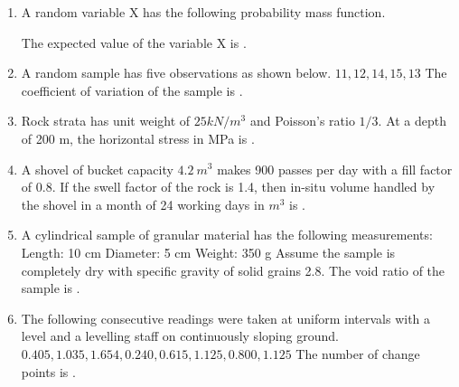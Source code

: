 \documentclass[journal,12pt,onecolumn]{IEEEtran}
\theoremstyle{remark}
\begin{document}
\begin{enumerate}
\hfill{}

\item A random variable X has the following probability mass function.

The expected value of the variable X is \underline{\hspace{2cm}} .

\hfill{}

\item A random sample has five observations as shown below.
$11, 12, 14, 15, 13$
The coefficient of variation of the sample is \underline{\hspace{2cm}} .

\hfill{}

\item Rock strata has unit weight of $25 kN/m^{3}$ and Poisson's ratio $1/3$. At a depth of 200 m, the horizontal stress in MPa is \underline{\hspace{2cm}} .

\hfill{}

\item A shovel of bucket capacity $4.2~m^{3}$ makes 900 passes per day with a fill factor of 0.8. If the swell factor of the rock is 1.4, then in-situ volume handled by the shovel in a month of 24 working days in $m^{3}$ is \underline{\hspace{2cm}} .

\hfill{}

\item A cylindrical sample of granular material has the following measurements:
Length: 10 cm
Diameter: 5 cm
Weight: 350 g
Assume the sample is completely dry with specific gravity of solid grains 2.8. The void ratio of the sample is \underline{\hspace{2cm}} .

\hfill{}

\item The following consecutive readings were taken at uniform intervals with a level and a levelling staff on continuously sloping ground.
$0.405, 1.035, 1.654, 0.240, 0.615, 1.125, 0.800, 1.125$
The number of change points is \underline{\hspace{2cm}}.


\end{enumerate}
\end{document}
